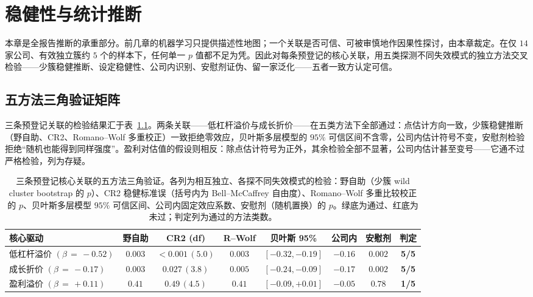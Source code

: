 \documentclass[UTF8, a4paper, fontset=none, zihao=-4]{ctexrep}
\begin{document}
\chapter{稳健性与统计推断}\label{ch:robust}
本章是全报告推断的承重部分。前几章的机器学习只提供描述性地图；一个关联是否可信、可被审慎地作因果性探讨，由本章裁定。在仅 $14$ 家公司、有效独立簇约 $5$ 个的样本下，任何单一 $p$ 值都不足为凭。因此对每条预登记的核心关联，用五类探测不同失效模式的独立方法交叉检验——少簇稳健推断、设定稳健性、公司内识别、安慰剂证伪、留一家泛化——五者一致方认定可信。

\section{五方法三角验证矩阵}
三条预登记关联的检验结果汇于表~\ref{tab:tri}。两条关联——低杠杆溢价与成长折价——在五类方法下全部通过：点估计方向一致，少簇稳健推断（野自助、CR2、Romano--Wolf 多重校正）一致拒绝零效应，贝叶斯多层模型的 $95\%$ 可信区间不含零，公司内估计符号不变，安慰剂检验拒绝“随机也能得到同样强度”。盈利对估值的假设则相反：除点估计符号为正外，其余检验全部不显著，公司内估计甚至变号——它通不过严格检验，列为存疑。

\begin{table}[htbp]
\caption{三条预登记核心关联的五方法三角验证。各列为相互独立、各探不同失效模式的检验：野自助（少簇 wild cluster bootstrap 的 $p$）、CR2 稳健标准误（括号内为 Bell--McCaffrey 自由度）、Romano--Wolf 多重比较校正的 $p$、贝叶斯多层模型 $95\%$ 可信区间、公司内固定效应系数、安慰剂（随机置换）的 $p$。绿底为通过、红底为未过；判定列为通过的方法类数。}
\label{tab:tri}
\footnotesize
\renewcommand{\arraystretch}{1.55}
\setlength{\tabcolsep}{4pt}
\begin{tabular*}{\textwidth}{@{\extracolsep{\fill}}lccccccc@{}}
\toprule
\textbf{\color{brandblue}核心驱动} & \textbf{\color{brandblue}野自助} & \textbf{\color{brandblue}CR2 (df)} & \textbf{\color{brandblue}R--Wolf} & \textbf{\color{brandblue}贝叶斯 95\%} & \textbf{\color{brandblue}公司内} & \textbf{\color{brandblue}安慰剂} & \textbf{\color{brandblue}判定} \\
\midrule
低杠杆溢价 $(\beta\,{=}\,{-}0.52)$ & \cellcolor{okbg}$0.003$ & \cellcolor{okbg}$<\!0.001\,(5.0)$ & \cellcolor{okbg}$0.003$ & \cellcolor{okbg}$[{-}0.32,{-}0.19]$ & \cellcolor{okbg}${-}0.16$ & \cellcolor{okbg}$0.002$ & \cellcolor{okbg}\textbf{5/5} \\
成长折价 $(\beta\,{=}\,{-}0.17)$ & \cellcolor{okbg}$0.003$ & \cellcolor{okbg}$0.027\,(3.8)$ & \cellcolor{okbg}$0.005$ & \cellcolor{okbg}$[{-}0.24,{-}0.09]$ & \cellcolor{okbg}${-}0.17$ & \cellcolor{okbg}$0.002$ & \cellcolor{okbg}\textbf{5/5} \\
盈利溢价 $(\beta\,{=}\,{+}0.11)$ & \cellcolor{nobg}$0.41$ & \cellcolor{nobg}$0.49\,(4.5)$ & \cellcolor{nobg}$0.41$ & \cellcolor{nobg}$[{-}0.09,{+}0.01]$ & \cellcolor{nobg}${-}0.05$ & \cellcolor{nobg}$0.78$ & \cellcolor{nobg}\textbf{1/5} \\
\bottomrule
\end{tabular*}
\end{table}
\end{document}
